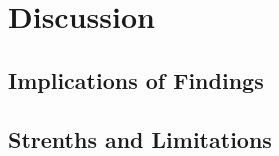 \section*{Discussion}

\subsection{Implications of Findings}
\label{sec:Implications of Findings}

\subsection{Strenths and Limitations}
\label{sec:Strenths and Limitations}

